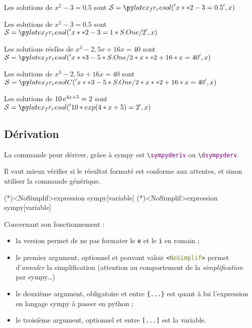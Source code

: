 \documentclass[french,a4paper,11pt]{article}
\newcommand\Cle[1]{{\bfseries\sffamily\textlangle #1\textrangle}}
\begin{document}
\begin{bloctext}
Les solutions de $x^2-3=\num{0.5}$ sont $\mathcal{S}=\dsympyresol{x**2-3=0.5}$

Les solutions de $x^2-3=\num{0.5}$ sont $\mathcal{S}=\dsympyresol{x**2-3=1/2}$
\end{bloctext}

\begin{bloctext}
Les solutions réelles de $x^3-2,5x+16x=40$ sont $\mathcal{S}=\dsympyresol{x**3-5/2*x**2+16*x = 40}$

Les solutions de $x^3-2,5x+16x=40$ sont $\mathcal{S}=\dsympyresolC{x**3-5/2*x**2+16*x = 40}$
\end{bloctext}

\begin{bloctext}
Les solutions de $10\,\mathrm{e}^{4x+5}=2$ sont $\mathcal{S}=\dsympyresol{10*exp(4*x+5)=2}$
\end{bloctext}

\subsection{Dérivation}

\begin{cautionblock}
La commande pour dériver, grâce à \textsf{sympy} est \texttt{\textbackslash \textcolor{purple}{sympyderiv}} ou \texttt{\textbackslash \textcolor{purple}{dsympyderv}}.

Il vaut mieux vérifier si le résultat formaté est conforme aux attentes, et sinon utiliser la commande générique.
\end{cautionblock}

\begin{bloctext}
\sympyderiv(*)<NoSimplif>{expression sympy}[variable]
\dsympyderiv(*)<NoSimplif>{expression sympy}[variable]
\end{bloctext}

\begin{tipblock}
Concernant son fonctionnement :

\begin{itemize}
	\item la version \Cle{*} permet de ne pas formater le \texttt{e} et le \texttt{i} en \textsf{romain} ;
	\item le premier argument, optionnel et pouvant valoir \texttt{<\textcolor{OliveDrab}{NoSimplif}>} permet d'\textit{annuler} la simplification (attention au comportement de la \textit{simplification} par \textsf{sympy}\ldots)
	\item le deuxième argument, obligatoire et entre \texttt{\{...\}} est quant à lui l'expression en langage \textsf{sympy} à passer en \textsf{python} ;
	\item le troisième argument, optionnel et entre \texttt{[...]} est la variable.
\end{itemize}
\vspace*{-\baselineskip}\leavevmode
\end{tipblock}
\end{document}
